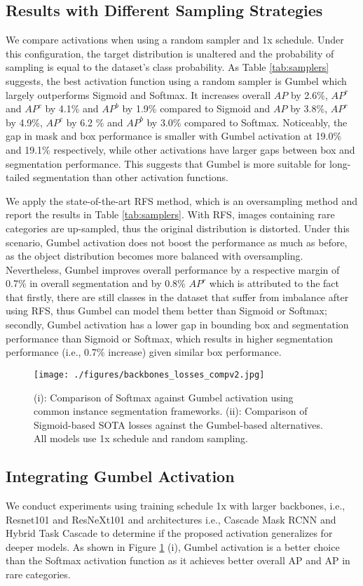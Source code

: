 \documentclass[runningheads]{llncs}
\begin{document}
\subsection{Results with Different Sampling Strategies}
We compare activations when using a random sampler and 1x schedule. Under this configuration, the target distribution is unaltered and the probability of sampling is equal to the dataset's class probability.
As Table \ref{tab:samplers} suggests, the best activation function using a random sampler is Gumbel which largely outperforms Sigmoid and Softmax. It increases overall $AP$ by 2.6\%, $AP^r$ and $AP^c$ by 4.1\% and $AP^b$  by 1.9\% compared to Sigmoid and $AP$ by 3.8\%, $AP^r$ by 4.9\%, $AP^c$ by 6.2 \% and $AP^b$ by 3.0\% compared to Softmax. Noticeably, the gap in mask and box performance is smaller with Gumbel activation at 19.0\% and 19.1\% respectively, while other activations have larger gaps between box and segmentation performance. This suggests that Gumbel is more suitable for long-tailed segmentation than other activation functions.

We apply the state-of-the-art RFS \cite{gupta2019lvis} method, which is an oversampling method and report the results in Table \ref{tab:samplers}. With RFS, images containing rare categories are up-sampled, thus the original distribution is distorted. Under this scenario, Gumbel activation does not boost the performance as much as before, as the object distribution becomes more balanced with oversampling. Nevertheless, Gumbel improves overall performance by a respective margin of 0.7\% in overall segmentation and by 0.8\% $AP^r$ which is attributed to the fact that firstly, there are still classes in the dataset that suffer from imbalance after using RFS, thus Gumbel can model them better than Sigmoid or Softmax; secondly, Gumbel activation has a lower gap in bounding box and segmentation performance than Sigmoid or Softmax, which results in higher segmentation performance (i.e., 0.7\% increase) given similar box performance.
\begin{figure}[t]
    \centering
    \texttt{[image: ./figures/backbones\_losses\_compv2.jpg]}
    \caption{(i): Comparison of Softmax against Gumbel activation using common instance segmentation frameworks. (ii): Comparison of Sigmoid-based SOTA losses against the Gumbel-based alternatives. All models use 1x schedule and random sampling.}
    \label{fig:backbones_losses}
\end{figure}

\subsection{Integrating Gumbel Activation}
We conduct experiments using training schedule 1x with larger backbones, i.e., Resnet101 \cite{he2016deep} and ResNeXt101 \cite{xie2017aggregated} and architectures i.e., Cascade Mask RCNN \cite{cai2019cascade} and Hybrid Task Cascade \cite{chen2019hybrid} to determine if the proposed activation generalizes for deeper models. As shown in Figure \ref{fig:backbones_losses} (i), Gumbel activation is a better choice than the Softmax activation function as it achieves better overall AP and AP in rare categories. 
\end{document}

